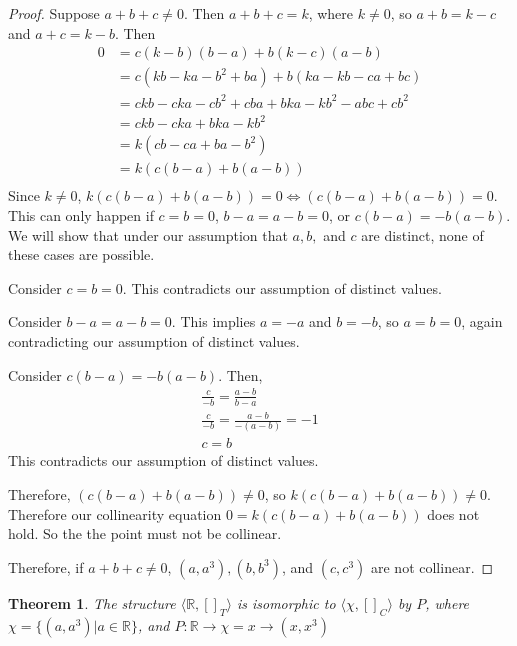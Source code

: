 \documentclass[11pt]{article}
\newtheorem{thm}{Theorem}
\begin{document}
\begin{proof}
    Suppose $a+b+c \neq 0$. Then $a+b+c = k$, where $k \neq 0$, so $a+b = k - c$ and $a + c = k - b$. Then \begin{align*}
        0 &= c(k-b)(b-a) + b(k-c)(a-b) \\ 
        &= c(kb - ka - b^2 + ba) + b(ka - kb - ca + bc) \\ 
        &= ckb - cka - cb^2 + cba + bka - kb^2 - abc + cb^2 \\ 
        &= ckb - cka + bka - kb^2  \\ 
        &= k(cb - ca + ba - b^2) \\ 
        &= k(c(b - a) + b(a - b)) \\ 
    \end{align*}
    Since $k \neq 0$, $k(c(b - a) + b(a-b)) = 0 \iff (c(b-a) + b(a-b)) = 0$. This can only happen if $c = b = 0$, $b-a = a-b = 0$, or $c(b-a) = -b(a-b)$. We will show that under our assumption that $a, b,$ and $c$ are distinct, none of these cases are possible. 

    Consider $c = b = 0$. This contradicts our assumption of distinct values. 

    Consider $b - a = a-b = 0$. This implies $a = -a$ and $b = -b$, so $a = b = 0$, again contradicting our assumption of distinct values. 

    Consider $c(b-a) = -b(a-b)$. Then, \begin{gather*}
        \frac{c}{-b} = \frac{a-b}{b-a} \\ 
        \frac{c}{-b} = \frac{a-b}{-(a-b)} = -1 \\ 
        c = b
    \end{gather*}
    This contradicts our assumption of distinct values. 

    Therefore, $(c(b-a) + b(a-b)) \neq 0$, so $k(c(b-a) + b(a-b)) \neq 0$. Therefore our collinearity equation $0 = k(c(b-a) + b(a-b))$ does not hold. So the the point must not be collinear.

    Therefore, if $a+b+c \neq 0$, $(a, a^3), (b, b^3)$, and $(c, c^3)$ are not collinear.
\end{proof}

\begin{thm}
    \label{thm:iso}
    The structure $\langle \mathbb{R}, []_T \rangle$ is isomorphic to $\langle \chi , []_{C} \rangle$ by $P$, where $\chi = \{(a, a^3) | a \in \mathbb{R}\}$, and $P: \mathbb{R} \to \chi = x \to (x, x^3)$
\end{thm}
\end{document}
